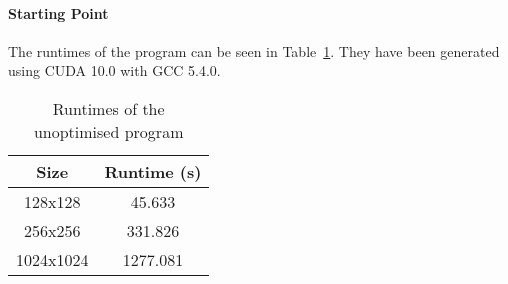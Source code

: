 


\paragraph{Starting Point}
The runtimes of the \lbm{} program can be seen in Table~\ref{table:base-runtimes}. They have been generated using CUDA 10.0 with GCC 5.4.0.

\begin{table}[ht]
\vspace{-5mm}
\centering
\caption{Runtimes of the unoptimised program}
\vspace{1mm}
\begin{tabular}{|c||c|}
    \hline
    Size & Runtime (s) \\
    \hline
    128x128 & 45.633 \\
    \hline
    256x256 & 331.826 \\
    \hline
    1024x1024 & 1277.081 \\
    \hline
\end{tabular}
\label{table:base-runtimes}
\vspace{-7mm}
\end{table}